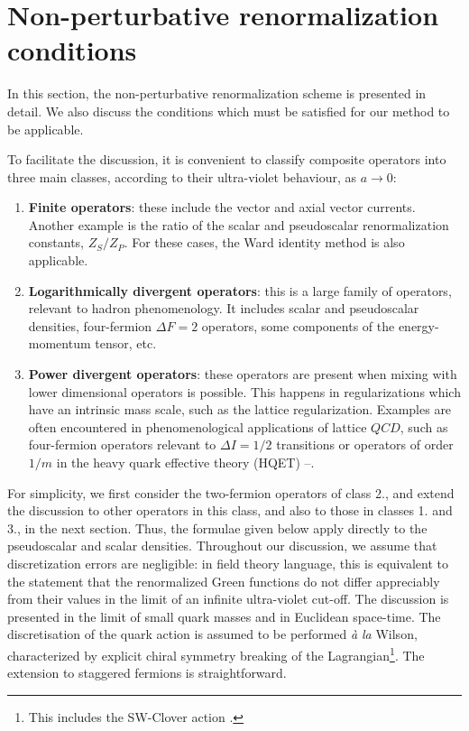 \section{Non-perturbative renormalization conditions}
\label{sec:idea}

In this section, the non-perturbative renormalization scheme
is presented in detail.  We also
discuss the conditions  which must be satisfied for our method to be
applicable.

To facilitate the discussion, it is convenient to classify composite operators
into three main classes, according to their ultra-violet behaviour, as
$a \to 0$:
\begin{enumerate}
\item {\bf Finite operators}: these include the vector and axial vector
currents. Another example  is  the ratio
of the  scalar and pseudoscalar renormalization constants, $Z_S/Z_P$. For
these cases, the Ward identity method is also applicable.
\item {\bf Logarithmically divergent operators}:
this is a large family of operators, relevant to hadron phenomenology.
It includes
   scalar and pseudoscalar densities,  four-fermion $\Delta F=2$
operators, some components of the energy-momentum tensor, etc.
\item
 {\bf Power divergent operators}: these operators are present
when  mixing with lower dimensional
operators is possible. This happens in regularizations which have  an intrinsic
mass scale, such as  the lattice regularization.
Examples are often encountered in phenomenological applications of
lattice $QCD$, such
as  four-fermion operators relevant to
$\Delta I=1/2$ transitions or operators of order $1/m$
in the heavy quark effective theory (HQET) \cite{effi}--\cite{efff}.
\end{enumerate}

For simplicity,
we first consider the two-fermion operators of class 2., and extend
the discussion to other operators in this class, and also to those
in classes
1. and 3., in the next section.
Thus, the formulae given below apply directly to the  pseudoscalar
and scalar densities. Throughout our discussion, we assume that discretization
errors are negligible: in field theory language, this is equivalent
to the statement that
the renormalized Green functions do not differ appreciably from their
values in the limit of an infinite  ultra-violet cut-off.
The discussion is presented in the  limit of small quark masses and
in  Euclidean space-time. The discretisation of the quark action is assumed
to be performed {\it \`a la} Wilson, characterized by   explicit chiral
symmetry
breaking of the Lagrangian\footnote{This includes the SW-Clover action
\cite{slami}.}. The extension to staggered fermions
 is straightforward.


